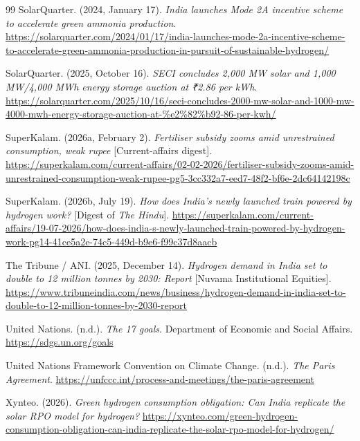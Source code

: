 {\begin{thebibliography}{99}
 SolarQuarter. (2024, January 17). \emph{India launches Mode 2A incentive scheme to accelerate green ammonia production}. \url{https://solarquarter.com/2024/01/17/india-launches-mode-2a-incentive-scheme-to-accelerate-green-ammonia-production-in-pursuit-of-sustainable-hydrogen/}

 SolarQuarter. (2025, October 16). \emph{SECI concludes 2,000 MW solar and 1,000 MW/4,000 MWh energy storage auction at ₹2.86 per kWh}. \url{https://solarquarter.com/2025/10/16/seci-concludes-2000-mw-solar-and-1000-mw-4000-mwh-energy-storage-auction-at-%e2%82%b92-86-per-kwh/}

 SuperKalam. (2026a, February 2). \emph{Fertiliser subsidy zooms amid unrestrained consumption, weak rupee} [Current-affairs digest]. \url{https://superkalam.com/current-affairs/02-02-2026/fertiliser-subsidy-zooms-amid-unrestrained-consumption-weak-rupee-pg5-3cc332a7-eed7-48f2-bf6e-2dc64142198c}

 SuperKalam. (2026b, July 19). \emph{How does India's newly launched train powered by hydrogen work?} [Digest of \emph{The Hindu}]. \url{https://superkalam.com/current-affairs/19-07-2026/how-does-india-s-newly-launched-train-powered-by-hydrogen-work-pg14-41ce5a2e-74c5-449d-b9e6-f99c37d8aacb}

 The Tribune / ANI. (2025, December 14). \emph{Hydrogen demand in India set to double to 12 million tonnes by 2030: Report} [Nuvama Institutional Equities]. \url{https://www.tribuneindia.com/news/business/hydrogen-demand-in-india-set-to-double-to-12-million-tonnes-by-2030-report}

 United Nations. (n.d.). \emph{The 17 goals}. Department of Economic and Social Affairs. \url{https://sdgs.un.org/goals}

 United Nations Framework Convention on Climate Change. (n.d.). \emph{The Paris Agreement}. \url{https://unfccc.int/process-and-meetings/the-paris-agreement}

 Xynteo. (2026). \emph{Green hydrogen consumption obligation: Can India replicate the solar RPO model for hydrogen?} \url{https://xynteo.com/green-hydrogen-consumption-obligation-can-india-replicate-the-solar-rpo-model-for-hydrogen/}

\end{thebibliography}
}
